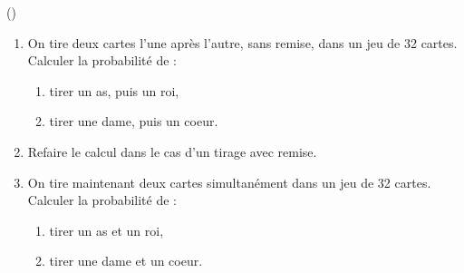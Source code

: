 \begin{exercice}\label{exo3-17} (\boringexo)

\begin{enumerate}
 \item On tire deux cartes l'une apr\`es l'autre, sans remise, dans un jeu de 32 cartes.\\
Calculer la probabilit\'e de :
\begin{enumerate}
 \item tirer un as, puis un roi,
 \item tirer une dame, puis un coeur. %
\end{enumerate}

\item Refaire le calcul dans le cas d'un tirage avec remise. %

\item On tire maintenant deux cartes simultan\'ement dans un jeu de 32 cartes.\\
Calculer la probabilit\'e de :

\begin{enumerate}
 \item tirer un as et un roi,
 \item tirer une dame et un coeur. %
\end{enumerate}

\end{enumerate}

\end{exercice}
